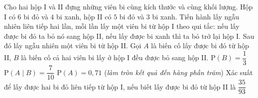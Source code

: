 \begin{ex}%
	Cho hai hộp I và II đựng những viên bi cùng kích thước và cùng khối lượng. Hộp I có $6$ bi đỏ và $4$ bi xanh, hộp II có $5$ bi đỏ và $3$ bi xanh. Tiến hành lấy ngẫu nhiên liên tiếp hai lần, mỗi lần lấy một viên bi từ hộp I theo qui tắc: nếu lấy được bi đỏ ta bỏ nó sang hộp II, nếu lấy được bi xanh thì ta bỏ trở lại hộp I. Sau đó lấy ngẫu nhiên một viên bi từ hộp II. Gọi $A$ là biến cố lấy được bi đỏ từ hộp II, $B$ là biến cố cả hai viên bi lấy ở hộp I đều được bỏ sang hộp II.
	\choiceTF
	{\True $\mathrm{P}(B) = \dfrac{1}{3}$}
	{\True $\mathrm{P}(A\mid B) = \dfrac{7}{10}$}
	{$\mathrm{P}(A) = 0{,}71$ (\textit{làm tròn kết quả đến hàng phần trăm})}
	{Xác suất để lấy được hai bi đỏ liên tiếp từ hộp I, nếu biết lấy được bi đỏ từ hộp II là $\dfrac{35}{93}$}
\end{ex}
